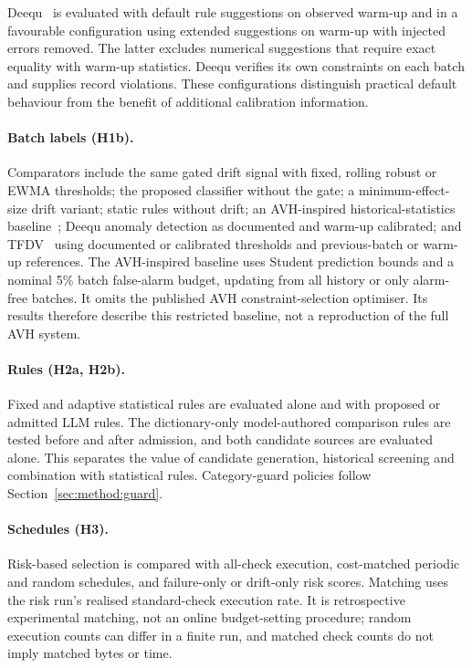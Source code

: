 Deequ~\cite{Schelter2018} is evaluated with default rule suggestions on observed warm-up and in a favourable configuration using extended suggestions on warm-up with injected errors removed. The latter excludes numerical suggestions that require exact equality with warm-up statistics. Deequ verifies its own constraints on each batch and supplies record violations. These configurations distinguish practical default behaviour from the benefit of additional calibration information.

\paragraph{Batch labels (H1b).} Comparators include the same gated drift signal with fixed, rolling robust or EWMA thresholds; the proposed classifier without the gate; a minimum-effect-size drift variant; static rules without drift; an AVH-inspired historical-statistics baseline~\cite{Tu2023}; Deequ anomaly detection as documented and warm-up calibrated; and TFDV~\cite{Caveness2020} using documented or calibrated thresholds and previous-batch or warm-up references. The AVH-inspired baseline uses Student prediction bounds and a nominal 5\% batch false-alarm budget, updating from all history or only alarm-free batches. It omits the published AVH constraint-selection optimiser. Its results therefore describe this restricted baseline, not a reproduction of the full AVH system.

\paragraph{Rules (H2a, H2b).} Fixed and adaptive statistical rules are evaluated alone and with proposed or admitted LLM rules. The dictionary-only model-authored comparison rules are tested before and after admission, and both candidate sources are evaluated alone. This separates the value of candidate generation, historical screening and combination with statistical rules. Category-guard policies follow Section~\ref{sec:method:guard}.

\paragraph{Schedules (H3).} Risk-based selection is compared with all-check execution, cost-matched periodic and random schedules, and failure-only or drift-only risk scores. Matching uses the risk run's realised standard-check execution rate. It is retrospective experimental matching, not an online budget-setting procedure; random execution counts can differ in a finite run, and matched check counts do not imply matched bytes or time.

